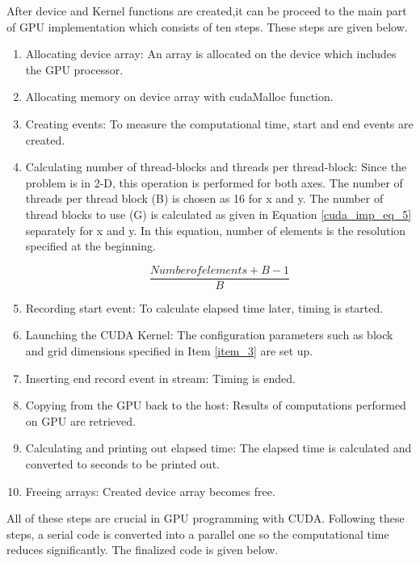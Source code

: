 \documentclass{article}
\begin{document}
After device and Kernel functions are created,it can be proceed to the main part of GPU implementation which consists of ten steps. These steps are given below. 

\begin{enumerate}
\color{black}
\item Allocating device array: An array is allocated on the device which includes the GPU processor. 
\label{item_1}
\item Allocating memory on device array with cudaMalloc function. 
\label{item_2}
\item Creating events: To measure the computational time, start and end events are created. 
\label{item_3}
\item Calculating number of thread-blocks and threads per thread-block: Since the problem is in 2-D, this operation is performed for both axes. The number of threads per thread block (B) is chosen as 16 for x and y. The number of thread blocks to use (G) is calculated as given in Equation \ref{cuda_imp_eq_5} separately for x and y. In this equation, number of elements is the resolution specified at the beginning. 

\begin{equation}  
    \frac{Number of elements + B - 1}{B}
    \label{cuda_imp_eq_5}
\end{equation}

\label{item_4}
\item Recording start event: To calculate elapsed time later, timing is started. 
\label{item_5}
\item Launching the CUDA Kernel: The configuration parameters such as block and grid dimensions specified in Item \ref{item_3} are set up. 
\label{item_6}
\item Inserting end record event in stream: Timing is ended. 
\label{item_7}
\item Copying from the GPU back to the host: Results of computations performed on GPU are retrieved. 
\label{item_8}
\item Calculating and printing out elapsed time: The elapsed time is calculated and converted to seconds to be printed out. 
\label{item_9}
\item Freeing arrays: Created device array becomes free. 
\label{item_10}
\end{enumerate}

All of these steps are crucial in GPU programming with CUDA. Following these steps, a serial code is converted into a parallel one so the computational time reduces significantly. The finalized code is given below. 
\end{document}
